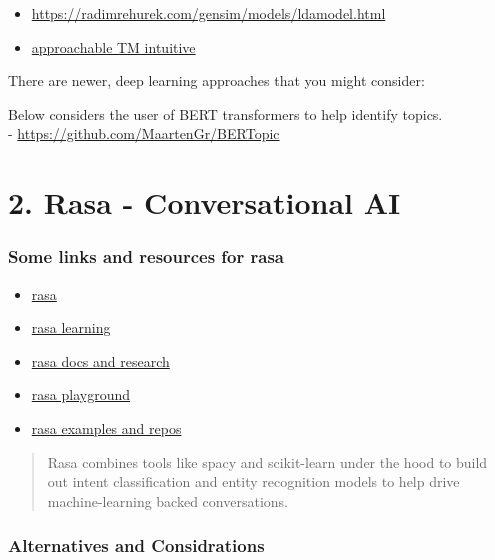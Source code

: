 \documentclass[
]{article}
\providecommand{\tightlist}{%
  \setlength{\itemsep}{0pt}\setlength{\parskip}{0pt}}
\begin{document}
\begin{itemize}
\tightlist
\item
  \url{https://radimrehurek.com/gensim/models/ldamodel.html}
\item
  \href{https://highdemandskills.com/topic-modeling-intuitive/}{approachable
  TM intuitive}
\end{itemize}

There are newer, deep learning approaches that you might consider:

Below considers the user of BERT transformers to help identify topics.\\
- \url{https://github.com/MaartenGr/BERTopic}

\hypertarget{rasa---conversational-ai}{%
\section{2. Rasa - Conversational AI}\label{rasa---conversational-ai}}

\hypertarget{some-links-and-resources-for-rasa}{%
\subsubsection{Some links and resources for
rasa}\label{some-links-and-resources-for-rasa}}

\begin{itemize}
\tightlist
\item
  \href{https://rasa.com/}{rasa}
\item
  \href{https://learning.rasa.com/}{rasa learning}
\item
  \href{https://rasa.com/docs/}{rasa docs and research}
\item
  \href{https://rasa.com/docs/rasa/playground/}{rasa playground}
\item
  \href{https://github.com/orgs/RasaHQ/repositories}{rasa examples and
  repos}
\end{itemize}

\begin{quote}
Rasa combines tools like spacy and scikit-learn under the hood to build
out intent classification and entity recognition models to help drive
machine-learning backed conversations.
\end{quote}

\hypertarget{alternatives-and-considrations}{%
\subsubsection{Alternatives and
Considrations}\label{alternatives-and-considrations}}
\end{document}
